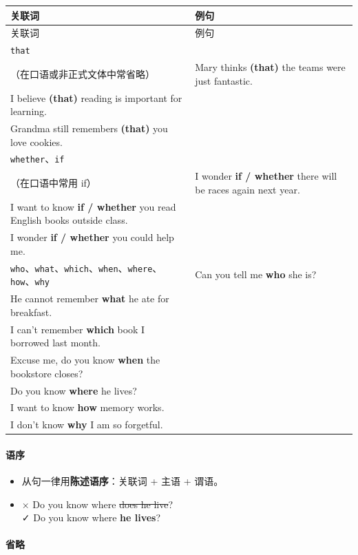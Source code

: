 \documentclass[11pt,a4paper]{ctexart}
\begin{document}
{\footnotesize
\begin{longtable}{p{6.70cm}p{6.70cm}}
\hline
关联词 & 例句 \\
\hline
\endfirsthead
\hline
关联词 & 例句 \\
\hline
\endhead
\hline
\endfoot
\texttt{that}\\ （在口语或非正式文体中常省略） & Mary thinks \textbf{(that)} the teams were just fantastic.\\ I believe \textbf{(that)} reading is important for learning.\\ Grandma still remembers \textbf{(that)} you love cookies. \\
\texttt{whether}、\texttt{if}\\ （在口语中常用 if） & I wonder \textbf{if / whether} there will be races again next year.\\ I want to know \textbf{if / whether} you read English books outside class.\\ I wonder \textbf{if / whether} you could help me. \\
\texttt{who}、\texttt{what}、\texttt{which}、\texttt{when}、\texttt{where}、\texttt{how}、\texttt{why} & Can you tell me \textbf{who} she is?\\ He cannot remember \textbf{what} he ate for breakfast.\\ I can’t remember \textbf{which} book I borrowed last month.\\ Excuse me, do you know \textbf{when} the bookstore closes?\\ Do you know \textbf{where} he lives?\\ I want to know \textbf{how} memory works.\\ I don’t know \textbf{why} I am so forgetful. \\
\end{longtable}
}

\paragraph{语序}

\begin{itemize}[leftmargin=1.4em]
\item 从句一律用\textbf{陈述语序}：关联词 + 主语 + 谓语。
\item × Do you know where \sout{does he live}?\\ ✓ Do you know where \textbf{he lives}?
\end{itemize}

\paragraph{省略}
\end{document}
